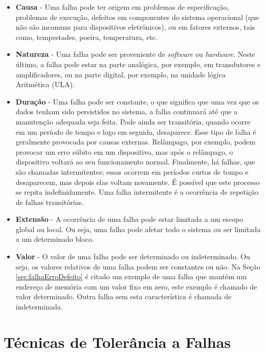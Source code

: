 \begin{itemize}
	\item \textbf{Causa} - Uma falha pode ter origem em problemas de especificação, problemas de execução, defeitos em componentes do sistema operacional (que não são incomuns para dispositivos eletrônicos), ou em fatores externos, tais como, tempestades, poeira, temperatura, etc.
	
	\item \textbf{Natureza} - Uma falha pode ser proveniente de \textit{software} ou \textit{hardware}. Neste último, a falha pode estar na parte analógica, por exemplo, em transdutores e amplificadores, ou na parte digital, por exemplo, na unidade lógica Aritmética (ULA).
	
	\item \textbf{Duração} - Uma falha pode ser constante, o que significa que uma vez que os dados tenham sido persistidos no sistema, a falha continuará até que a manutenção adequada seja feita. Pode ainda ser transitória, quando ocorre em um período de tempo e logo em seguida, desaparece. Esse tipo de falha é geralmente provocada por causas externas. Relâmpago, por exemplo, podem provocar um erro súbito em um dispositivo, mas após o relâmpago, o dispositivo voltará ao seu funcionamento normal. Finalmente, há falhas, que são chamadas intermitentes; essas ocorrem em períodos curtos de tempo e desaparecem, mas depois elas voltam novamente. É possível que este processo se repita indefinidamente. Uma falha intermitente é a ocorrência de repetição de falhas transitórias.
	
	\item \textbf{Extensão} - A ocorrência de uma falha pode estar limitada a um escopo global ou local. Ou seja, uma falha pode afetar todo o sistema ou ser limitada a um determinado bloco. 
	
	\item \textbf{Valor} - O valor de uma falha pode ser determinado ou indeterminado. Ou seja, os valores relativos de uma falha podem ser constantes ou não. Na Seção \ref{sec:falhaErroDefeito} é citado um exemplo de uma falha que mantém um endereço de memória com um valor fixo em zero, este exemplo é chamado de valor determinado. Outra falha sem esta característica é chamada de indeterminada.
	
	
	
\end{itemize}


\section{Técnicas de Tolerância a Falhas}\label{sec:tecnica}

